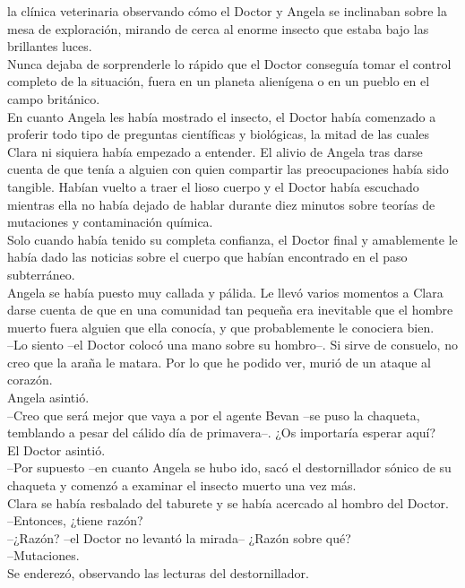 la clínica veterinaria observando cómo el Doctor y Angela se inclinaban
sobre la mesa de exploración, mirando de cerca al enorme insecto que
estaba bajo las brillantes luces.\\
Nunca dejaba de sorprenderle lo rápido que el Doctor conseguía tomar el
control completo de la situación, fuera en un planeta alienígena o en un
pueblo en el campo británico.\\
En cuanto Angela les había mostrado el insecto, el Doctor había
comenzado a proferir todo tipo de preguntas científicas y biológicas, la
mitad de las cuales Clara ni siquiera había empezado a entender. El
alivio de Angela tras darse cuenta de que tenía a alguien con quien
compartir las preocupaciones había sido tangible. Habían vuelto a traer
el lioso cuerpo y el Doctor había escuchado mientras ella no había
dejado de hablar durante diez minutos sobre teorías de mutaciones y
contaminación química.\\
Solo cuando había tenido su completa confianza, el Doctor final y
amablemente le había dado las noticias sobre el cuerpo que habían
encontrado en el paso subterráneo.\\
Angela se había puesto muy callada y pálida. Le llevó varios momentos a
Clara darse cuenta de que en una comunidad tan pequeña era inevitable
que el hombre muerto fuera alguien que ella conocía, y que probablemente
le conociera bien.\\
--Lo siento --el Doctor colocó una mano sobre su hombro--. Si sirve de
consuelo, no creo que la araña le matara. Por lo que he podido ver,
murió de un ataque al corazón.\\
Angela asintió.\\
--Creo que será mejor que vaya a por el agente Bevan --se puso la
chaqueta, temblando a pesar del cálido día de primavera--. ¿Os
importaría esperar aquí?\\
El Doctor asintió.\\
--Por supuesto --en cuanto Angela se hubo ido, sacó el destornillador
sónico de su chaqueta y comenzó a examinar el insecto muerto una vez
más.\\
Clara se había resbalado del taburete y se había acercado al hombro del
Doctor.\\
--Entonces, ¿tiene razón?\\
--¿Razón? --el Doctor no levantó la mirada-- ¿Razón sobre qué?\\
--Mutaciones.\\
Se enderezó, observando las lecturas del destornillador.\\
